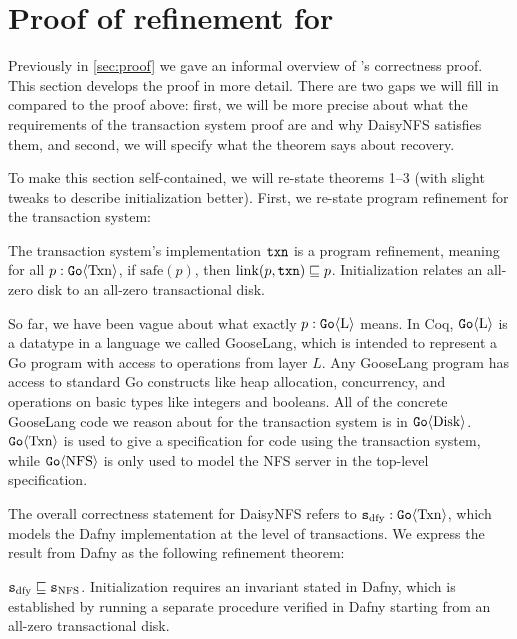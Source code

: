 \section{Proof of refinement for \sys}
\label{appendix:proof}

\setcounter{theorem}{0}

Previously in \cref{sec:proof} we gave an informal overview of \sys's
correctness proof. This section develops the proof in more detail. There are two
gaps we will fill in compared to the proof above: first, we will be more precise
about what the requirements of the transaction system proof are and why DaisyNFS
satisfies them, and second, we will specify what the theorem says about recovery.

To make this section self-contained, we will re-state theorems 1--3 (with slight
tweaks to describe initialization better). First, we re-state program refinement
for the transaction system:

\begin{theorem}
  The transaction system's implementation $\texttt{txn}$ is a program refinement,
  meaning for all $p : \mathtt{Go}\langle \mathrm{Txn} \rangle$, if $\mathrm{safe}(p)$, then
  $\mathrm{link}(p, \texttt{txn}) \sqsubseteq p$. Initialization relates an all-zero
  disk to an all-zero transactional disk.
  \label{thm:txn-appendix}
\end{theorem}

So far, we have been vague about what exactly $p : \mathtt{Go}\langle \mathrm{L} \rangle$ means. In
Coq, $\mathtt{Go}\langle \mathrm{L} \rangle$ is a datatype in a language we called GooseLang, which is
intended to represent a Go program with access to operations from layer $L$. Any
GooseLang program has access to standard Go constructs like heap allocation,
concurrency, and operations on basic types like integers and booleans. All of
the concrete GooseLang code we reason about for the transaction system is in
$\mathtt{Go}\langle \mathrm{Disk} \rangle$. $\mathtt{Go}\langle \mathrm{Txn} \rangle$ is used to give a specification for code
using the transaction system, while $\mathtt{Go}\langle \mathrm{NFS} \rangle$ is only used to model the
NFS server in the top-level specification.

The overall correctness statement for DaisyNFS refers to
$\texttt{s}_{\mathrm{dfy}} : \mathtt{Go}\langle \mathrm{Txn} \rangle$, which models the Dafny implementation at the level
of transactions. We express the result from Dafny as the following refinement
theorem:

\begin{theorem}
  $\texttt{s}_{\mathrm{dfy}} \sqsubseteq \texttt{s}_{\mathrm{NFS}}$. Initialization requires an invariant stated in Dafny,
  which is established by running a separate  procedure verified in
  Dafny starting from an all-zero transactional disk.
  \label{thm:dafny}
\end{theorem}

